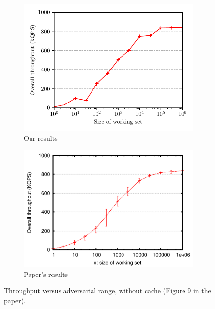 \documentclass[10pt,letterpaper]{article}
\begin{document}
\begin{figure}[h]
\centering
\begin{subfigure}[t]{.47\textwidth}
	\centering	
	\includegraphics[scale=0.73]{img/throughput_vs_working_set_no_cache.pdf}
	\caption{Our results}
\end{subfigure}\hfill
\begin{subfigure}[t]{.47\textwidth}
	\centering
	\includegraphics[scale=0.2]{img/throughput_vs_working_set_no_cache_paper.png}
	\caption{Paper's results}
\end{subfigure}
\caption{Throughput versus adversarial range, without cache (Figure 9 in the paper).}
\label{fig:throughput_vs_working_set_no_cache}
\end{figure}
\end{document}
